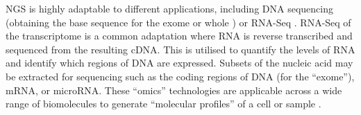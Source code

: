 
\gls{NGS} is highly adaptable to different applications, including \acrshort{DNA} sequencing (obtaining the base sequence for the exome or whole ) or \gls{RNA-Seq} \citep{Waldron2016, Goodwin2016, Tran2012}. %
\gls{RNA-Seq} of the \gls{transcriptome} is a common adaptation where \acrshort{RNA} is reverse transcribed and sequenced from the resulting \gls{cDNA}. This is utilised to quantify the levels of \acrshort{RNA} and identify which regions of \acrshort{DNA} are expressed. 
Subsets of the nucleic acid may be extracted for sequencing such as the coding regions of \acrshort{DNA} (for the ``exome''),  %
mRNA,  %
or \gls{microRNA}. %
These ``\gls{omics}'' technologies \citep{Roychowdhury2016, Waldron2016} are applicable across a wide range of biomolecules to generate ``\glspl{molecular profile}'' of a cell or sample \citep{Perou2000}. %

